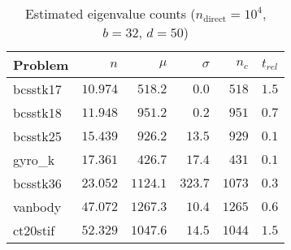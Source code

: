\documentclass[%
	paper=a4,
	fontsize=10pt,
	DIV11,BCOR10mm,
	numbers=noenddot,
	abstract=yes
]{scrartcl}
\theoremstyle{definition}
\begin{document}
\begin{table}
	\begin{center}
		\begin{tabular}{lrrrrr}
			Problem & $n$ & $\mu$ & $\sigma$ & $n_c$ & $t_{rel}$ \\
			\toprule
			bcsstk17 & $10.974$ &  $518.2$ &   $0.0$ &  $518$ & $1.5$ \\
			bcsstk18 & $11.948$ &  $951.2$ &   $0.2$ &  $951$ & $0.7$ \\
			bcsstk25 & $15.439$ &  $926.2$ &  $13.5$ &  $929$ & $0.1$ \\
			gyro\_k  & $17.361$ &  $426.7$ &  $17.4$ &  $431$ & $0.1$ \\
			bcsstk36 & $23.052$ & $1124.1$ & $323.7$ & $1073$ & $0.3$ \\
			vanbody  & $47.072$ & $1267.3$ &  $10.4$ & $1265$ & $0.6$ \\
			ct20stif & $52.329$ & $1047.6$ &  $14.5$ & $1044$ & $1.5$
		\end{tabular}
	\end{center}
	\caption{Estimated eigenvalue counts ($n_{\text{direct}} = 10^4$, $b = 32$,
	$d = 50$)}
	\label{tab:eigenvalue-count-ndirect1e4}
\end{table}

\printbibliography
\end{document}
